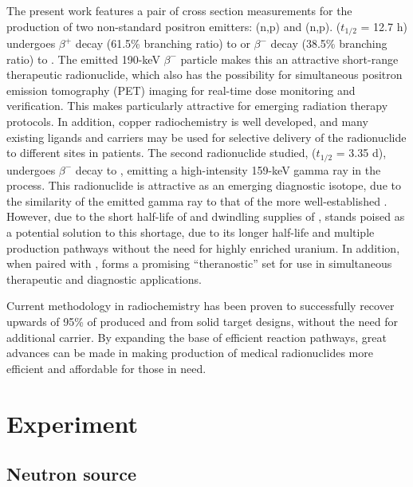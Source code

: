 \documentclass[5p]{elsarticle}
\newcommand{\comment}[1]{\todo[color=blue!20!white,inline]{ASV: #1}}
\begin{document}
The present work features a pair of cross section measurements for the production of two non-standard positron emitters: (n,p) and (n,p).   ($t_{1/2}$ = 12.7 h) undergoes $\beta^+$ decay (61.5\% branching ratio) to  or $\beta^-$ decay (38.5\% branching ratio) to . The emitted 190-keV $\beta^-$ particle makes this an  attractive short-range therapeutic radionuclide, which also has the possibility for simultaneous positron emission tomography (PET) imaging for real-time dose monitoring and verification. This makes  particularly attractive for emerging radiation therapy protocols. In addition, copper radiochemistry is well developed, and many existing ligands and carriers may be used for selective delivery of the radionuclide to different sites in patients. The second radionuclide studied,  ($t_{1/2}$ = 3.35 d), undergoes $\beta^-$ decay to , emitting a high-intensity 159-keV gamma ray in the process. This radionuclide is  attractive as an emerging diagnostic isotope, due to the similarity of the emitted gamma ray to that of the more well-established . However, due to the short half-life of and dwindling supplies of ,  stands poised as a potential solution to this shortage, due to its longer half-life and multiple production pathways without the need for highly enriched uranium. In addition, when paired with ,  forms a promising \enquote{theranostic} set for use in simultaneous therapeutic and diagnostic applications.

\comment{cite theranostic papers, etc}



Current methodology in radiochemistry has been proven to successfully recover upwards of 95\% of produced  and  from solid target designs, without the need for additional carrier. By expanding the base of efficient reaction pathways, great advances can be made in making production of medical radionuclides more efficient and affordable for those in need.






\section{Experiment}\label{sec:experiment}



\subsection{Neutron source}\label{sec:n_source}
\end{document}

